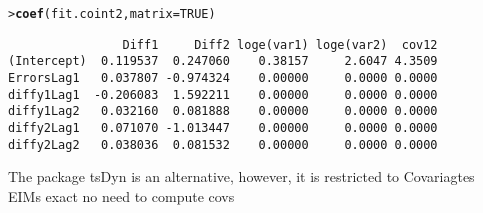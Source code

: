 \documentclass[a4paper, 11pt]{article}\usepackage[]{graphicx}\usepackage[]{color}
\makeatletter
\newcommand{\hlnum}[1]{\textcolor[rgb]{0.686,0.059,0.569}{#1}}%
\newcommand{\hlstd}[1]{\textcolor[rgb]{0.345,0.345,0.345}{#1}}%
\newcommand{\hlkwc}[1]{\textcolor[rgb]{0.333,0.667,0.333}{#1}}%
\newcommand{\hlkwd}[1]{\textcolor[rgb]{0.737,0.353,0.396}{\textbf{#1}}}%
\newenvironment{kframe}{%
 \def\at@end@of@kframe{}%
 \ifinner\ifhmode%
  \def\at@end@of@kframe{\end{minipage}}%
  \begin{minipage}{\columnwidth}%
 \fi\fi%
 \def\FrameCommand##1{\hskip\@totalleftmargin \hskip-\fboxsep
 \colorbox{shadecolor}{##1}\hskip-\fboxsep
     \hskip-\linewidth \hskip-\@totalleftmargin \hskip\columnwidth}%
 \MakeFramed {\advance\hsize-\width
   \@totalleftmargin\z@ \linewidth\hsize
   \@setminipage}}%
 {\par\unskip\endMakeFramed%
 \at@end@of@kframe}
\newenvironment{knitrout}{}{} %
\makeatother
\begin{document}
\begin{knitrout}\scriptsize
{}\color{fgcolor}\begin{kframe}
\begin{alltt}
\hlstd{> }\hlkwd{coef}\hlstd{(fit.coint2,} \hlkwc{matrix} \hlstd{=} \hlnum{TRUE}\hlstd{)}
\end{alltt}
\begin{verbatim}
                Diff1     Diff2 loge(var1) loge(var2)  cov12
(Intercept)  0.119537  0.247060    0.38157     2.6047 4.3509
ErrorsLag1   0.037807 -0.974324    0.00000     0.0000 0.0000
diffy1Lag1  -0.206083  1.592211    0.00000     0.0000 0.0000
diffy1Lag2   0.032160  0.081888    0.00000     0.0000 0.0000
diffy2Lag1   0.071070 -1.013447    0.00000     0.0000 0.0000
diffy2Lag2   0.038036  0.081532    0.00000     0.0000 0.0000
\end{verbatim}
\end{kframe}
\end{knitrout}

The package 
{\color{cyan} \textsf{tsDyn}} is an alternative, however,
it is restricted to 
Covariagtes
EIMs exact 
no need to compute covs
\newpage
 
\nocite{*}
\end{document}
